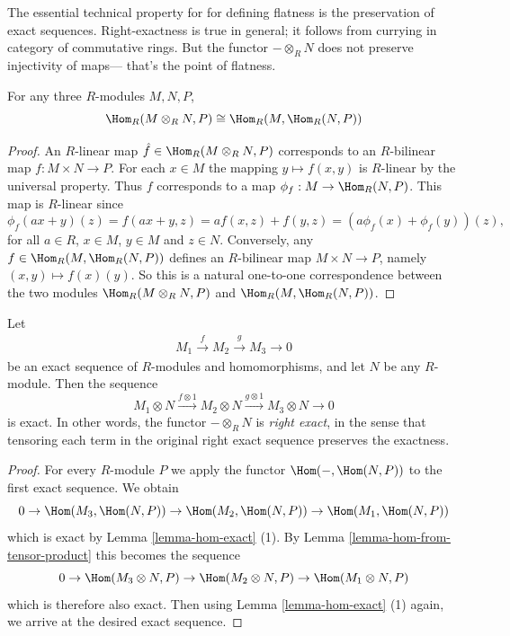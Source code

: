 \documentclass{book}
\begin{document}
\noindent
The essential technical property
for for defining flatness
is the preservation of exact sequences.
Right-exactness is true in general;
it follows from currying in category
of commutative rings.
But the functor $-\otimes_R N$ does not
preserve injectivity of maps---
that's the point of flatness.

\begin{lemma}
\label{lemma-hom-from-tensor-product}
For any three $R$-modules $M, N, P$,
$$
\Hom_R(M \otimes_R N, P) \cong \Hom_R(M,
\Hom_R(N, P))
$$
\end{lemma}

\begin{proof}
An $R$-linear map $\hat{f}\in \Hom_R(M
\otimes_R N, P)$ corresponds to an
$R$-bilinear map $f : M \times N \to P$. For
each $x\in M$ the mapping $y\mapsto f(x, y)$
is $R$-linear by the universal
property. Thus $f$ corresponds to a
map $\phi_f : M \to \Hom_R(N, P)$. This map
is $R$-linear since
$$
\phi_f(ax + y)(z) =
f(ax + y, z) = af(x, z)+f(y, z) =
(a\phi_f(x)+\phi_f(y))(z),
$$
for all $a \in R$, $x \in M$, $y \in M$ and
$z \in N$. Conversely, any
$f \in \Hom_R(M, \Hom_R(N, P))$ defines an
$R$-bilinear
map $M \times N \to P$, namely $(x, y)\mapsto
f(x)(y)$.
So this is a natural one-to-one
correspondence between the
two modules
$\Hom_R(M \otimes_R N, P)$ and $\Hom_R(M,
\Hom_R(N, P))$.
\end{proof}

\begin{lemma}
\label{lemma-tensor-product-exact}
Let
$$
\begin{aligned}
M_1\xrightarrow{f} M_2\xrightarrow{g} M_3 \to
0
\end{aligned}
$$
be an exact sequence of $R$-modules and
homomorphisms, and let $N$ be any
$R$-module. Then the sequence
\begin{equation}
\label{equation-2ndex}
M_1\otimes N\xrightarrow{f \otimes 1}
M_2\otimes N \xrightarrow{g \otimes 1}
M_3\otimes N \to 0
\end{equation}
is exact. In other words, the functor $-
\otimes_R N$ is
{\it right exact}, in the sense that
tensoring
each term in the original right exact
sequence preserves the exactness.
\end{lemma}

\begin{proof}
For every $R$-module $P$
we apply the functor $\Hom(-, \Hom(N, P))$ to
the first exact
sequence. We obtain
$$
0 \to
\Hom(M_3, \Hom(N, P)) \to
\Hom(M_2, \Hom(N, P)) \to
\Hom(M_1, \Hom(N, P))
$$
which is exact by Lemma \ref{lemma-hom-exact}
(1).
By Lemma \ref{lemma-hom-from-tensor-product}
this becomes the sequence
$$
0 \to \Hom(M_3 \otimes N, P) \to
\Hom(M_2 \otimes N, P) \to \Hom(M_1 \otimes
N, P)
$$
which is therefore also exact. Then using
Lemma \ref{lemma-hom-exact} (1) again, we
arrive at the desired exact sequence.
\end{proof}
\end{document}
